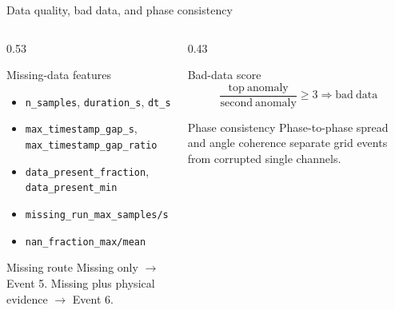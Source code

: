 ﻿\documentclass[10pt,aspectratio=169]{beamer}
\newcommand{\code}[1]{\texttt{\footnotesize #1}}
\begin{document}
\fi
\begin{frame}{Data quality, bad data, and phase consistency}
\small
\begin{columns}[T,totalwidth=\textwidth]
\begin{column}{0.53\textwidth}
\begin{block}{Missing-data features}
\begin{itemize}
  \item \code{n\_samples}, \code{duration\_s}, \code{dt\_s}
  \item \code{max\_timestamp\_gap\_s}, \code{max\_timestamp\_gap\_ratio}
  \item \code{data\_present\_fraction}, \code{data\_present\_min}
  \item \code{missing\_run\_max\_samples/s}
  \item \code{nan\_fraction\_max/mean}
\end{itemize}
\end{block}
\begin{alertblock}{Missing route}
Missing only $\rightarrow$ Event 5. Missing plus physical evidence $\rightarrow$ Event 6.
\end{alertblock}
\end{column}
\begin{column}{0.43\textwidth}
\begin{exampleblock}{Bad-data score}
\[
\frac{\mathrm{top\ anomaly}}{\mathrm{second\ anomaly}}\ge3
\Rightarrow \mathrm{bad\ data}
\]
\end{exampleblock}
\begin{block}{Phase consistency}
Phase-to-phase spread and angle coherence separate grid events from corrupted single channels.
\end{block}
\end{column}
\end{columns}
\end{frame}
\end{document}
